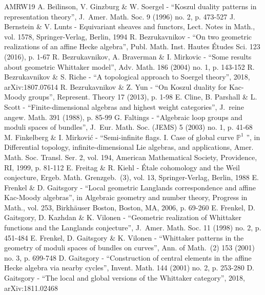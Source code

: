\begin{thebibliography}{AMRW19}
 A. Beĭlinson, V. Ginzburg \& W. Soergel - “Koszul duality patterns in representation theory”, J. Amer. Math. Soc. 9 (1996) no. 2, p. 473-527
 J. Bernstein \& V. Lunts - Equivariant sheaves and functors, Lect. Notes in Math., vol. 1578, Springer-Verlag, Berlin, 1994
 R. Bezrukavnikov - “On two geometric realizations of an affine Hecke algebra”, Publ. Math. Inst. Hautes Études Sci. 123 (2016), p. 1-67
 R. Bezrukavnikov, A. Braverman \& I. Mirkovic - “Some results about geometric Whittaker model”, Adv. Math. 186 (2004) no. 1, p. 143-152
 R. Bezrukavnikov \& S. Riche - “A topological approach to Soergel theory”, 2018, arXiv:1807.07614
 R. Bezrukavnikov \& Z. Yun - “On Koszul duality for Kac-Moody groups”, Represent. Theory 17 (2013), p. 1-98
 E. Cline, B. Parshall \& L. Scott - “Finite-dimensional algebras and highest weight categories”, J. reine angew. Math. 391 (1988), p. 85-99
 G. Faltings - “Algebraic loop groups and moduli spaces of bundles”, J. Eur. Math. Soc. (JEMS) 5 (2003) no. 1, p. 41-68
 M. Finkelberg \& I. Mirković - “Semi-infinite flags. I. Case of global curve $\mathbb{P}^1$ ”, in Differential topology, infinite-dimensional Lie algebras, and applications, Amer. Math. Soc. Transl. Ser. 2, vol. 194, American Mathematical Society, Providence, RI, 1999, p. 81-112
 E. Freitag \& R. Kiehl - Étale cohomology and the Weil conjecture, Ergeb. Math. Grenzgeb. (3), vol. 13, Springer-Verlag, Berlin, 1988
 E. Frenkel \& D. Gaitsgory - “Local geometric Langlands correspondence and affine Kac-Moody algebras”, in Algebraic geometry and number theory, Progress in Math., vol. 253, Birkhäuser Boston, Boston, MA, 2006, p. 69-260
 E. Frenkel, D. Gaitsgory, D. Kazhdan \& K. Vilonen - “Geometric realization of Whittaker functions and the Langlands conjecture”, J. Amer. Math. Soc. 11 (1998) no. 2, p. 451-484
 E. Frenkel, D. Gaitsgory \& K. Vilonen - “Whittaker patterns in the geometry of moduli spaces of bundles on curves”, Ann. of Math. (2) 153 (2001) no. 3, p. 699-748
 D. Gaitsgory - “Construction of central elements in the affine Hecke algebra via nearby cycles”, Invent. Math. 144 (2001) no. 2, p. 253-280
 D. Gaitsgory - “The local and global versions of the Whittaker category”, 2018, arXiv:1811.02468

\end{thebibliography}
